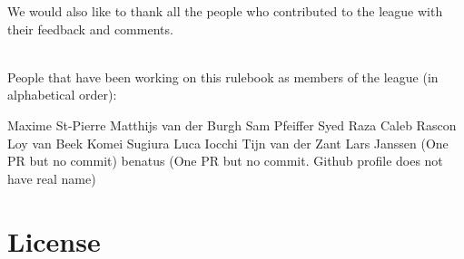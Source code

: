 We would also like to thank all the people who contributed to the \AtHome{} league with their feedback and comments.

~\\\noindent People that have been working on this rulebook as members of the league (in alphabetical order):
\begin{center}
	\begin{minipage}{0.8\textwidth}
		\begin{multicols}{3}%
			\footnotesize
			\noindent%

Maxime St-Pierre
Matthijs van der Burgh
Sam Pfeiffer
Syed Raza
Caleb Rascon
Loy van Beek
Komei Sugiura
Luca Iocchi
Tijn van der Zant
			Lars Janssen (One PR but no commit)
			benatus (One PR but no commit. Github profile does not have real name)

		\end{multicols}
	\end{minipage}
\end{center}

\section*{License}

\doclicenseThis



